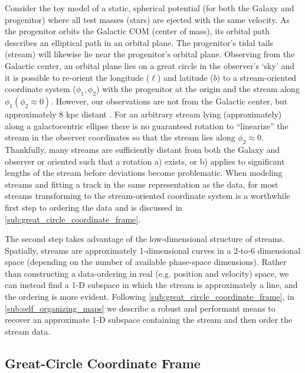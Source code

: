 \documentclass[fleqn,usenatbib]{mnras}
\begin{document}
  Consider the toy model of a static, spherical potential (for both the Galaxy
  and progenitor) where all test masses (stars) are ejected with the same
  velocity. As the progenitor orbits the Galactic COM (center of mass), its
  orbital path describes an elliptical path in an orbital plane. The
  progenitor's tidal tails (stream) will likewise lie near the progenitor's
  orbital plane. Observing from the Galactic center, an orbital plane lies on a
  great circle in the observer's `sky' and it is possible to re-orient the
  longitude ($\ell$) and latitude ($b$) to a stream-oriented coordinate system
  ($\phi_1, \phi_2$) with the progenitor at the origin and the stream along
  $\phi_1 (\phi_2 \approx 0)$. However, our observations are not from the
  Galactic center, but approximately 8 kpc distant \citep[for recent
  measurements, see][]{GRAVITY2018, Leung2022}. For an arbitrary stream lying
  (approximately) along a galactocentric ellipse there is no guaranteed rotation
  to ``linearize'' the stream in the observer coordinates so that the stream
  lies along $\phi_2 \approx 0$. Thankfully, many streams are sufficiently
  distant from both the Galaxy and observer or oriented such that a rotation a)
  exists, or b) applies to significant lengths of the stream before deviations
  become problematic. When modeling streams and fitting a track in the same
  representation as the data, for most streams transforming to the
  stream-oriented coordinate system is a worthwhile first step to ordering the
  data and is discussed in \autoref{sub:great_circle_coordinate_frame}.
  
  The second step takes advantage of the low-dimensional structure of streams.
  Spatially, streams are approximately 1-dimensional curves in a 2-to-6
  dimensional space (depending on the number of available phase-space
  dimensions). Rather than constructing a data-ordering in real (e.g. position
  and velocity) space, we can instead find a 1-D subspace in which the stream is
  approximately a line, and the ordering is more evident. Following
  \autoref{sub:great_circle_coordinate_frame}, in
  \autoref{sub:self_organizing_maps} we describe a robust and performant means
  to recover an approximate 1-D subspace containing the stream and then order
  the stream data.

  \subsection{Great-Circle Coordinate Frame}
  \label{sub:great_circle_coordinate_frame}
\end{document}
